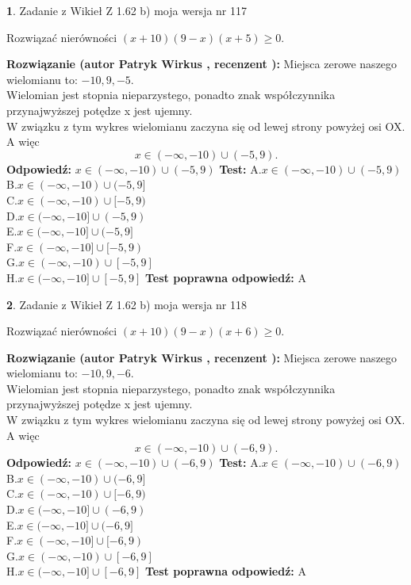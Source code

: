 \documentclass[12pt, a4paper]{article}
\theoremstyle{definition} %
\newtheorem{zad}{}
\newcommand{\zadStart}[1]{\begin{zad}#1\newline}
\newcommand{\zadStop}{\end{zad}}
\newcommand{\rozwStart}[2]{\noindent \textbf{Rozwiązanie (autor #1 , recenzent #2): }\newline}
\newcommand{\rozwStop}{\newline}
\newcommand{\odpStart}{\noindent \textbf{Odpowiedź:}\newline}
\newcommand{\odpStop}{\newline}
\newcommand{\testStart}{\noindent \textbf{Test:}\newline}
\newcommand{\testStop}{\newline}
\newcommand{\kluczStart}{\noindent \textbf{Test poprawna odpowiedź:}\newline}
\newcommand{\kluczStop}{\newline}
\begin{document}
\zadStart{Zadanie z Wikieł Z 1.62 b) moja wersja nr 117}

Rozwiązać nierówności $(x+10)(9-x)(x+5)\ge0$.
\zadStop
\rozwStart{Patryk Wirkus}{}
Miejsca zerowe naszego wielomianu to: $-10, 9, -5$.\\
Wielomian jest stopnia nieparzystego, ponadto znak współczynnika przy\linebreak najwyższej potędze x jest ujemny.\\ W związku z tym wykres wielomianu zaczyna się od lewej strony powyżej osi OX. A więc $$x \in (-\infty,-10) \cup (-5,9).$$
\rozwStop
\odpStart
$x \in (-\infty,-10) \cup (-5,9)$
\odpStop
\testStart
A.$x \in (-\infty,-10) \cup (-5,9)$\\
B.$x \in (-\infty,-10) \cup (-5,9]$\\
C.$x \in (-\infty,-10) \cup [-5,9)$\\
D.$x \in (-\infty,-10] \cup (-5,9)$\\
E.$x \in (-\infty,-10] \cup (-5,9]$\\
F.$x \in (-\infty,-10] \cup [-5,9)$\\
G.$x \in (-\infty,-10) \cup [-5,9]$\\
H.$x \in (-\infty,-10] \cup [-5,9]$
\testStop
\kluczStart
A
\kluczStop



\zadStart{Zadanie z Wikieł Z 1.62 b) moja wersja nr 118}

Rozwiązać nierówności $(x+10)(9-x)(x+6)\ge0$.
\zadStop
\rozwStart{Patryk Wirkus}{}
Miejsca zerowe naszego wielomianu to: $-10, 9, -6$.\\
Wielomian jest stopnia nieparzystego, ponadto znak współczynnika przy\linebreak najwyższej potędze x jest ujemny.\\ W związku z tym wykres wielomianu zaczyna się od lewej strony powyżej osi OX. A więc $$x \in (-\infty,-10) \cup (-6,9).$$
\rozwStop
\odpStart
$x \in (-\infty,-10) \cup (-6,9)$
\odpStop
\testStart
A.$x \in (-\infty,-10) \cup (-6,9)$\\
B.$x \in (-\infty,-10) \cup (-6,9]$\\
C.$x \in (-\infty,-10) \cup [-6,9)$\\
D.$x \in (-\infty,-10] \cup (-6,9)$\\
E.$x \in (-\infty,-10] \cup (-6,9]$\\
F.$x \in (-\infty,-10] \cup [-6,9)$\\
G.$x \in (-\infty,-10) \cup [-6,9]$\\
H.$x \in (-\infty,-10] \cup [-6,9]$
\testStop
\kluczStart
A
\kluczStop
\end{document}
